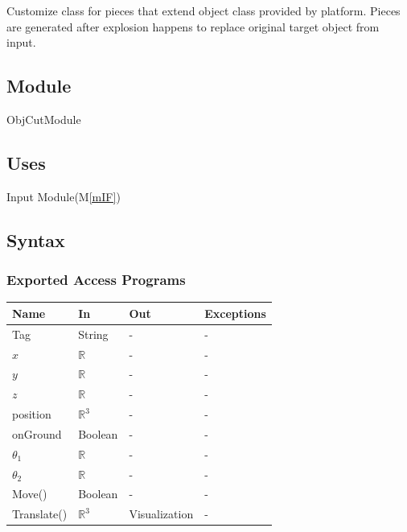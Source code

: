 \documentclass[12pt, titlepage]{article}
\newcommand{\mref}[1]{M\ref{#1}}
\begin{document}
Customize class for pieces that extend object class provided by platform. Pieces are generated after explosion happens to replace original target object from input.

\subsection{Module}

ObjCutModule

\subsection{Uses}

Input Module(\mref{mIF})

\subsection{Syntax}

\subsubsection{Exported Access Programs}

\begin{center}
	\begin{tabular}{p{2cm} p{4cm} p{4cm} p{2cm}}
		\hline
		\textbf{Name} & \textbf{In} & \textbf{Out} & \textbf{Exceptions} \\
		\hline
		Tag & String & - & - \\
		$x$ & $\mathbb{R}$ & - & - \\
		$y$ & $\mathbb{R}$ & - & - \\
		$z$ & $\mathbb{R}$ & - & - \\
		position & $\mathbb{R}^{3}$ & - & - \\
		onGround & Boolean & - & - \\
		$\theta_{1}$ & $\mathbb{R}$ & - & - \\
		$\theta_{2}$ & $\mathbb{R}$ & - & - \\
		Move() & Boolean & - & - \\
		Translate() & $\mathbb{R}^{3}$ & Visualization & - \\
		\hline
	\end{tabular}
\end{center}
\end{document}
